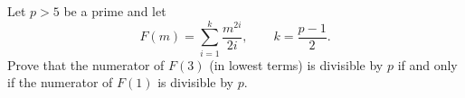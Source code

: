 Let $p>5$ be a prime and let
\[F(m)=\sum_{i=1}^{k}\dfrac{m^{2i}}{2i},\qquad k=\dfrac{p-1}2.\]
Prove that the numerator of $F(3)$ (in lowest terms) is divisible by $p$ if and only if the numerator of $F(1)$ is divisible by $p$.
